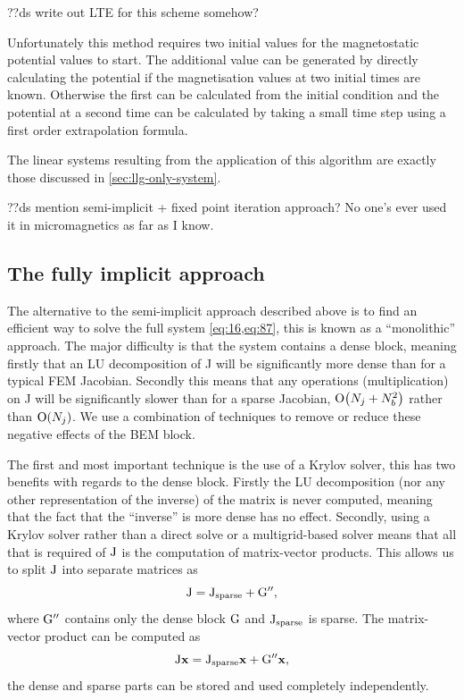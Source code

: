 ??ds write out LTE for this scheme somehow?

Unfortunately this method requires two initial values for the magnetostatic potential values to start.
The additional value can be generated by directly calculating the potential if the magnetisation values at two initial times are known.
Otherwise the first can be calculated from the initial condition and the potential at a second time can be calculated by taking a small time step using a first order extrapolation formula.

The linear systems resulting from the application of this algorithm are exactly those discussed in \cref{sec:llg-only-system}.


??ds mention semi-implicit + fixed point iteration approach? No one's ever used it in micromagnetics as far as I know.


\subsection{The fully implicit approach}
\label{sec:fully-implicit-bem}

The alternative to the semi-implicit approach described above is to find an efficient way to solve the full system \cref{eq:16,eq:87}, this is known as a ``monolithic'' approach.
The major difficulty is that the system contains a dense block, meaning firstly that an LU decomposition of J will be significantly more dense than for a typical FEM Jacobian.
Secondly this means that any operations (\eg multiplication) on J will be significantly slower than for a sparse Jacobian, $\mathrm{O}{\left( N_j + N_b^2 \right)}$ rather than $\mathrm{O}{\left( N_j \right)}$.
We use a combination of techniques to remove or reduce these negative effects of the BEM block.

The first and most important technique is the use of a Krylov solver, this has two benefits with regards to the dense block.
Firstly the LU decomposition (nor any other representation of the inverse) of the matrix is never computed, meaning that the fact that the ``inverse'' is more dense has no effect.
Secondly, using a Krylov solver rather than a direct solve or a multigrid-based solver means that all that is required of $\mathrm{J}$ is the computation of matrix-vector products.
This allows us to split $\mathrm{J}$ into separate matrices as
\begin{equation}
  \mathrm{J} = \mathrm{J}_{\textrm{sparse}} + \mathrm{G}'',
\end{equation}
where $\mathrm{G}''$ contains only the dense block $\mathrm{G}$ and $\mathrm{J}_{\textrm{sparse}}$ is sparse.
The matrix-vector product can be computed as
\begin{equation}
  \mathrm{J} \boldsymbol{\mathrm{x}} = \mathrm{J}_{\textrm{sparse}}\boldsymbol{\mathrm{x}} + \mathrm{G}''\boldsymbol{\mathrm{x}},
\end{equation}
\ie the dense and sparse parts can be stored and used completely independently.

